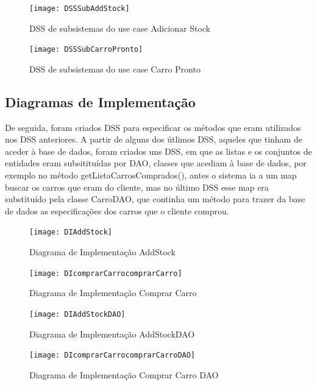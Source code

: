 \documentclass[10pt, a4paper]{article}
\begin{document}
\begin{figure}[!htb]
\centering
\texttt{[image: DSSSubAddStock]}
\caption{DSS de subsistemas do use case Adicionar Stock}
\label{DSSSubAS}
\end{figure}

\begin{figure}[!htb]
\centering
\texttt{[image: DSSSubCarroPronto]}
\caption{DSS de subsistemas do use case Carro Pronto}
\label{DSSSubCP}
\end{figure}


\newpage
\subsection{Diagramas de Implementação}
De seguida, foram criados DSS para especificar os métodos que eram utilizados nos DSS anteriores. A partir de alguns dos útlimos DSS, aqueles que tinham de aceder à base de dados, foram criados uns DSS, em que as listas e os conjuntos de entidades eram subsitituídas por DAO, classes que acediam à base de dados, por exemplo no método getListaCarrosComprados(), antes o sistema ia a um map buscar os carros que eram do cliente, mas no último DSS esse map era substituído pela classe CarroDAO, que continha um método para trazer da base de dados as especificações dos carros que o cliente comprou.

\begin{figure}[!htb]
\centering
\texttt{[image: DIAddStock]}
\caption{Diagrama de Implementação AddStock}
\label{DIAS}
\end{figure}

\begin{figure}[!htb]
\centering
\texttt{[image: DIcomprarCarrocomprarCarro]}
\caption{Diagrama de Implementação Comprar Carro}
\label{DICC}
\end{figure}

\begin{figure}[!htb]
\centering
\texttt{[image: DIAddStockDAO]}
\caption{Diagrama de Implementação AddStockDAO}
\label{DIASDAO}
\end{figure}

\begin{figure}[!htb]
\centering
\texttt{[image: DIcomprarCarrocomprarCarroDAO]}
\caption{Diagrama de Implementação Comprar Carro DAO}
\label{DICCDAO}
\end{figure}


\newpage
\end{document}
